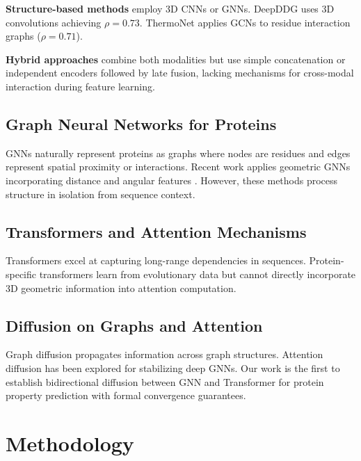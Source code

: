 \documentclass[12pt,en]{elegantpaper}
\begin{document}
\textbf{Structure-based methods} \citep{li2020predicting,cao2019deepddg} employ 3D CNNs or GNNs. DeepDDG \citep{cao2019deepddg} uses 3D convolutions achieving $\rho = 0.73$. ThermoNet \citep{li2020predicting} applies GCNs to residue interaction graphs ($\rho = 0.71$).

\textbf{Hybrid approaches} \citep{zhou2020mutation} combine both modalities but use simple concatenation or independent encoders followed by late fusion, lacking mechanisms for cross-modal interaction during feature learning.

\subsection{Graph Neural Networks for Proteins}

GNNs \citep{kipf2017semi,velivckovic2018graph} naturally represent proteins as graphs where nodes are residues and edges represent spatial proximity or interactions. Recent work applies geometric GNNs incorporating distance and angular features \citep{jing2021learning}. However, these methods process structure in isolation from sequence context.

\subsection{Transformers and Attention Mechanisms}

Transformers \citep{vaswani2017attention} excel at capturing long-range dependencies in sequences. Protein-specific transformers \citep{rives2021biological,rao2021transformer} learn from evolutionary data but cannot directly incorporate 3D geometric information into attention computation.

\subsection{Diffusion on Graphs and Attention}

Graph diffusion \citep{klicpera2019diffusion} propagates information across graph structures. Attention diffusion \citep{li2020deepergcn} has been explored for stabilizing deep GNNs. Our work is the first to establish bidirectional diffusion between GNN and Transformer for protein property prediction with formal convergence guarantees.

\section*{Methodology}
\end{document}

